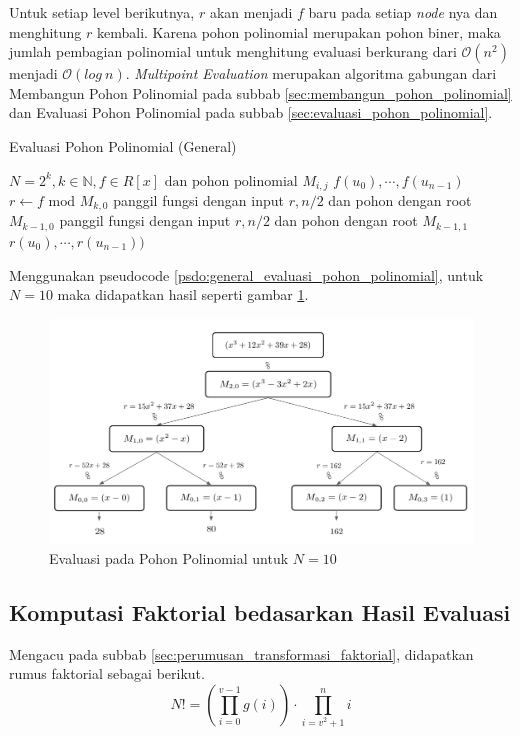 Untuk setiap level berikutnya, $ r $ akan menjadi $ f $ baru pada setiap \textit{node} nya dan menghitung $ r $ kembali. Karena pohon polinomial merupakan pohon biner, maka jumlah pembagian polinomial untuk menghitung evaluasi berkurang dari $ \mathcal{O}{(n^2)} $ menjadi $ \mathcal{O}{(log \ n)} $. \textit{Multipoint Evaluation} merupakan algoritma gabungan dari Membangun Pohon Polinomial pada subbab \ref{sec:membangun_pohon_polinomial} dan Evaluasi Pohon Polinomial pada subbab \ref{sec:evaluasi_pohon_polinomial}.
\begin{algorithm}
	\caption{Evaluasi Pohon Polinomial (General)}
	\label{psdo:general_evaluasi_pohon_polinomial}
	\begin{algorithmic}[1]
		\Require $ N = 2^k, k \in \mathbb{N},f \in R[x] \text{ dan pohon polinomial } M_{i,j}  $
		\Ensure $ f(u_0), \cdots , f(u_{n-1}) $
		\State $ r \gets f \text{ mod } M_{k,0} $
		\State panggil fungsi dengan input $ r, n/2 $ dan pohon dengan root $ M_{k-1,0} $
		\State panggil fungsi dengan input $ r, n/2 $ dan pohon dengan root $ M_{k-1,1} $ \\
		\Return $ r(u_0), \cdots , r(u_{n-1})) $
	\end{algorithmic}
\end{algorithm}

Menggunakan pseudocode \ref{psdo:general_evaluasi_pohon_polinomial}, untuk $ N = 10 $ maka didapatkan hasil seperti gambar \ref{fig:evaluasi-pohon-n-10}.

\begin{figure}
	\Centering
	\includegraphics [scale=0.25]{bab2/img/evaluasi-pohon-n-10}
	\caption{Evaluasi pada Pohon Polinomial untuk $ N = 10 $}
	\label{fig:evaluasi-pohon-n-10}
\end{figure}


\subsection{Komputasi Faktorial bedasarkan Hasil Evaluasi}
Mengacu pada subbab \ref{sec:perumusan_transformasi_faktorial}, didapatkan rumus faktorial sebagai berikut.
$$ N ! = \left( \prod_{i=0}^{v-1} g(i) \right) \cdot \prod_{i=v^2+1}^n i $$

